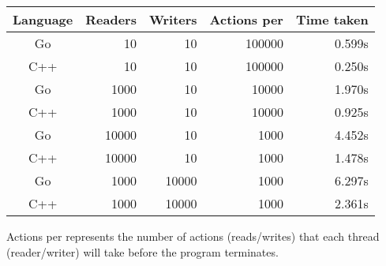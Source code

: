 \documentclass[11pt]{article}
\begin{document}
\begin{tabular}{c r r r r}
Language    & Readers & Writers & Actions per & Time taken \\
\toprule
Go 			& 10 & 10 & 100000 & 0.599s \\
C++         & 10 & 10 & 100000 & 0.250s \\
\cmidrule{1-5}
Go 			& 1000 & 10 & 10000 & 1.970s \\
C++         & 1000 & 10 & 10000 & 0.925s \\
\cmidrule{1-5}
Go 			& 10000 & 10 & 1000 & 4.452s \\
C++         & 10000 & 10 & 1000 & 1.478s \\
\cmidrule{1-5}
Go 			& 1000 & 10000 & 1000 & 6.297s \\
C++         & 1000 & 10000 & 1000 & 2.361s \\
\end{tabular}
\newline
Actions per represents the number of actions (reads/writes) that each thread (reader/writer) will take before the program terminates.
\pagebreak
\end{document}
